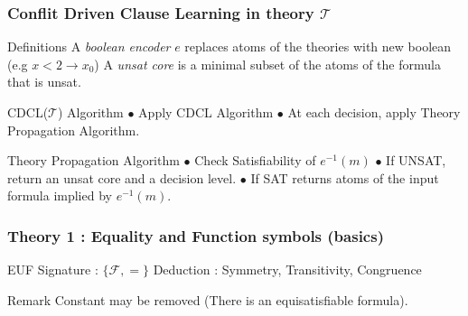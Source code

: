 \documentclass[pdf]{beamer}
\newcommand{\T}{\mathcal{T}} %
\newcommand{\F}{\mathcal{F}}
\begin{document}
\begin{frame}
\frametitle{Conflit Driven Clause Learning in theory $\T$}

\begin{block}{Definitions}
A \emph{boolean encoder} $e$ replaces atoms of the theories with new boolean \newline 
(e.g $x<2 \rightarrow x_0$)\newline
A \emph{unsat core} is a minimal subset of the atoms of the formula that is unsat.\newline
\end{block}

\begin{block}{CDCL($\T$) Algorithm}
$\bullet$ Apply CDCL Algorithm \newline
$\bullet$ At each decision, apply Theory Propagation Algorithm.\newline
\end{block}


\begin{block}{Theory Propagation Algorithm}
$\bullet$ Check Satisfiability of $e^{-1}(m)$ \newline
$\bullet$ If UNSAT, return an unsat core and a decision level.\newline
$\bullet$ If SAT returns atoms of the input formula implied by $e^{-1}(m)$.\newline
\end{block}


\end{frame}

\begin{frame}
\frametitle{Theory 1 : Equality and Function symbols (basics)}

\begin{block}{EUF}
Signature : $\{\F,=\}$ \newline
Deduction : Symmetry, Transitivity, Congruence
\end{block}

\begin{exampleblock}{Remark}
Constant may be removed (There is an equisatisfiable formula).
\end{exampleblock}

\end{frame}
\end{document}
